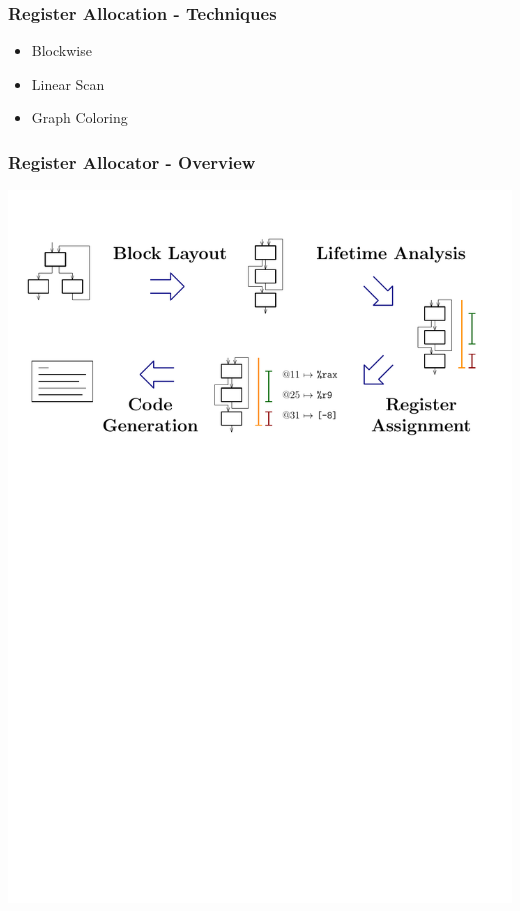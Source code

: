 \documentclass[navbaroff,en]{sdqbeamer}
\begin{document}
\begin{frame}
    \frametitle{Register Allocation - Techniques}

    \begin{itemize}
    	\item Blockwise
        \item Linear Scan
        \item Graph Coloring
    \end{itemize}

\end{frame}

\begin{frame}
\frametitle{Register Allocator - Overview}

\centering \includegraphics[scale=0.7]{images/overview.pdf}

\end{frame}
\end{document}
